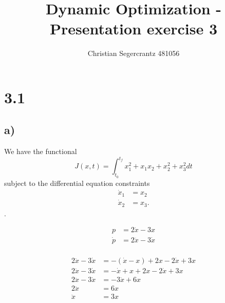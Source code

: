 \documentclass{article}
\title{Dynamic Optimization - Presentation exercise 3}
\author{Christian Segercrantz 481056}
\begin{document}
	\maketitle
	\pagebreak

\section*{3.1}
\subsection*{a)}
	
We have the functional
\begin{equation}
	J(x,t) = \int_{t_0}^{t_f} x_1^2 +x_1x_2+x_2^2+x_3^2 dt
\end{equation}
subject to the differential equation constraints
\begin{align}
	\dot{x}_1 &= x_2\\
	\dot{x}_2 &= x_3.
\end{align}.

\begin{align}
	p &= 2\dot{x} - 3x \\
	\dot{p} &= 2\ddot{x} - 3\dot{x}\\
\end{align}

\begin{align}
	2\ddot{x} - 3\dot{x} &= -(\dot{x} - x) +2x - 2\dot{x} + 3x\\
	2\ddot{x} - 3\dot{x}&= -\dot{x} +x +2x - 2\dot{x} + 3x\\
	2\ddot{x} - 3\dot{x} &= -3\dot{x}+6x\\
	2\ddot{x} &= 6x\\
	\ddot{x} &= 3x
\end{align}


	
\end{document}
